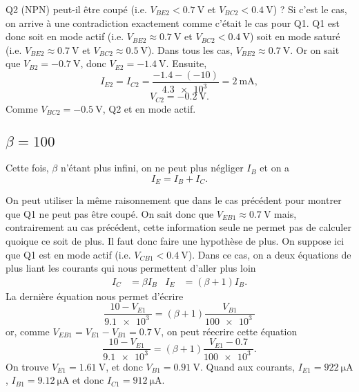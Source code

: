 \documentclass[frenchb,DIV=13]{scrartcl}
\begin{document}
Q2 (NPN) peut-il être coupé (i.e. $V_{BE2} < \SI{0.7}{\volt}$ et $V_{BC2} < \SI{0.4}{\volt}$) ?
Si c'est le cas, on arrive à une contradiction exactement comme c'était le cas pour Q1.
Q1 est donc soit en mode actif (i.e. $V_{BE2} \approx \SI{0.7}{\volt}$ et $V_{BC2} < \SI{0.4}{\volt}$)
soit en mode saturé (i.e. $V_{BE2} \approx \SI{0.7}{\volt}$ et $V_{BC2} \approx \SI{0.5}{\volt}$). Dans
tous les cas, $V_{BE2} \approx \SI{0.7}{\volt}$. Or on sait que $V_{B2} = -\SI{0.7}{\volt}$, donc
$V_{E2} = -\SI{1.4}{\volt}$. Ensuite,
\[ I_{E2} = I_{C2} = \frac{-1.4-(-10)}{\SI{4.3e3}{}} = \SI{2}{\milli\ampere}, \]
\[ V_{C2} = -\SI{0.2}{\volt}. \]
Comme $V_{BC2} = -\SI{0.5}{\volt}$, Q2 et en mode actif. 

\subsection*{$\beta = 100$}
Cette fois, $\beta$ n'étant plus infini, on ne peut plus négliger $I_B$ et on a
\[ I_E = I_B + I_C. \]

On peut utiliser la même raisonnement que dans le cas précédent pour montrer que Q1
ne peut pas être coupé. On sait donc que $V_{EB1} \approx \SI{0.7}{\volt}$ mais,
contrairement au cas précédent, cette information seule ne permet pas de calculer
quoique ce soit de plus. Il faut donc faire une hypothèse de plus. On suppose ici que
Q1 est en mode actif (i.e. $V_{CB1} < \SI{0.4}{\volt}$). Dans ce cas, on a deux équations
de plus liant les courants qui nous permettent d'aller plus loin
\begin{align*}
	I_C &= \beta I_B & I_E &= (\beta+1)I_B.
\end{align*}
La dernière équation nous permet d'écrire
\[ \frac{10-V_{E1}}{\SI{9.1e3}{}} = (\beta+1)\frac{V_{B1}}{\SI{100e3}{}} \]
or, comme $V_{EB1} = V_{E1}-V_{B1} = \SI{0.7}{\volt}$, on peut réecrire cette
équation
\[ \frac{10-V_{E1}}{\SI{9.1e3}{}} = (\beta+1)\frac{V_{E1}-0.7}{\SI{100e3}{}}. \]
On trouve $V_{E1} = \SI{1.61}{\volt}$, et donc $V_{B1} = \SI{0.91}{\volt}$. Quand aux
courants, $I_{E1} = \SI{922}{\micro\ampere}$, $I_{B1} = \SI{9.12}{\micro\ampere}$ et
donc $I_{C1} = \SI{912}{\micro\ampere}$.
\end{document}
